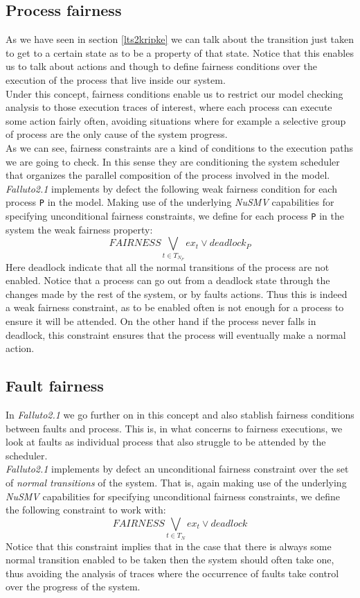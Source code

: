 \documentclass[12pt]{article}
\begin{document}
\subsection{Process fairness}\label{process fairness}
As we have seen in section \ref{lts2kripke} we can talk about the
transition just taken to get to a certain state as to be a property of that
state. Notice that this enables us to talk about actions and though to define
fairness conditions over the execution of the process that live inside our
system.\\
Under this concept, fairness conditions enable us to restrict our model
checking analysis to those execution traces of interest, where each process
can execute some action fairly often, avoiding situations where for example a
selective group of process are the only cause of the system progress.\\        %
As we can see, fairness constraints are a kind of conditions to the execution
paths we are going to check. In this sense they are conditioning the system
scheduler that organizes the parallel composition of the process involved in
the model.\\
\mbox{\textit{Falluto2.1}} implements by defect the following weak fairness
condition for each process \texttt{P} in the model. Making use of the
underlying \mbox{\textit{NuSMV}} capabilities for specifying unconditional
fairness constraints, we define for each process \texttt{P} in the system the
weak fairness property:
$$FAIRNESS \bigvee_{t \in T_{N_{P}}} ex_t \vee deadlock_P$$
Here deadlock indicate that all the normal transitions of the process are
not enabled. Notice that a process can go out from a deadlock state through the
changes made by the rest of the system, or by faults actions. Thus this is 
indeed a weak fairness constraint, as to be enabled often is not enough for a
process to ensure it will be attended. On the other hand if the process never
falls in deadlock, this constraint ensures that the process will eventually
make a normal action.


\subsection{Fault fairness}\label{fault fairness}
In \mbox{\textit{Falluto2.1}} we go further on in this concept and also 
stablish fairness conditions between faults and process. This is, in what
concerns to fairness executions, we look at faults as individual process
that also struggle to be attended by the scheduler.\\
\mbox{\textit{Falluto2.1}} implements by defect an unconditional fairness
constraint over the set of \textit{normal transitions} of the system. That
is, again making use of the underlying \mbox{\textit{NuSMV}} capabilities for
specifying unconditional fairness constraints, we define the following
constraint to work with: $$FAIRNESS \bigvee_{t \in T_N} ex_t \vee deadlock$$
Notice that this constraint implies that in the case that there is always some
normal transition enabled to be taken then the system should often take one,
thus avoiding the analysis of traces where the occurrence of faults take
control over the progress of the system. 
\end{document}
